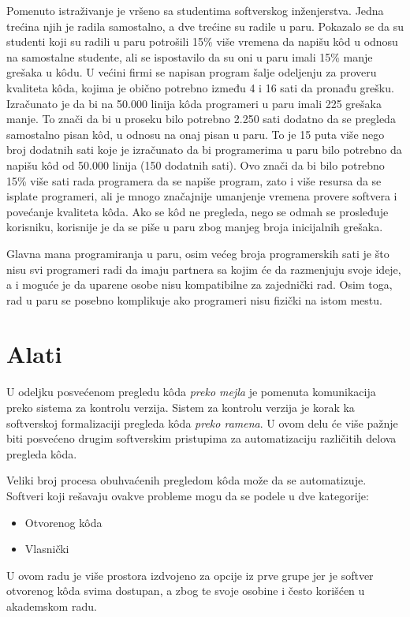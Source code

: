 \documentclass[a4paper]{article}
\begin{document}
    Pomenuto istraživanje je vršeno sa studentima softverskog inženjerstva. \cite{Cockburn00thecosts} Jedna trećina njih je radila samostalno, a dve trećine su radile u paru. Pokazalo se da su studenti koji su radili u paru potrošili 15\% više vremena da napišu kôd u odnosu na samostalne studente, ali se ispostavilo da su oni u paru imali 15\% manje grešaka u kôdu. U većini firmi se napisan program šalje odeljenju za proveru kvaliteta kôda, kojima je obično potrebno između 4 i 16 sati da pronađu grešku. Izračunato je da bi na 50.000 linija kôda programeri u paru imali 225 grešaka manje. To znači da bi u proseku bilo potrebno 2.250 sati dodatno da se pregleda samostalno pisan kôd, u odnosu na onaj pisan u paru. To je 15 puta više nego broj dodatnih sati koje je izračunato da bi programerima u paru bilo potrebno da napišu kôd od 50.000 linija (150 dodatnih sati). Ovo znači da bi bilo potrebno 15\% više sati rada programera da se napiše program, zato i više resursa da se isplate programeri, ali je mnogo značajnije umanjenje vremena provere softvera i povećanje kvaliteta kôda. Ako se kôd ne pregleda, nego se odmah se prosleđuje korisniku, korisnije je da se piše u paru zbog manjeg broja inicijalnih grešaka.
    
    Glavna mana programiranja u paru, osim većeg broja programerskih sati je što nisu svi programeri radi da imaju partnera sa kojim će da razmenjuju svoje ideje, a i moguće je da uparene osobe nisu kompatibilne za zajednički rad. Osim toga, rad u paru se posebno komplikuje ako programeri nisu fizički na istom mestu. \cite{bkspcr}
        
        
        
\section{Alati}
U odeljku posvećenom pregledu kôda \textit{preko mejla} je pomenuta komunikacija preko sistema za kontrolu verzija. Sistem za kontrolu verzija je korak ka softverskoj formalizaciji pregleda kôda \textit{preko ramena}. U ovom delu će više pažnje biti posvećeno drugim softverskim pristupima za automatizaciju različitih delova pregleda kôda.

Veliki broj procesa obuhvaćenih pregledom kôda može da se automatizuje. Softveri koji rešavaju ovakve probleme mogu da se podele u dve kategorije:
\begin{itemize}
    \item Otvorenog kôda
    \item Vlasnički
\end{itemize}
U ovom radu je više prostora izdvojeno za opcije iz prve grupe jer je softver otvorenog kôda svima dostupan, a zbog te svoje osobine i često korišćen u akademskom radu.
\end{document}

